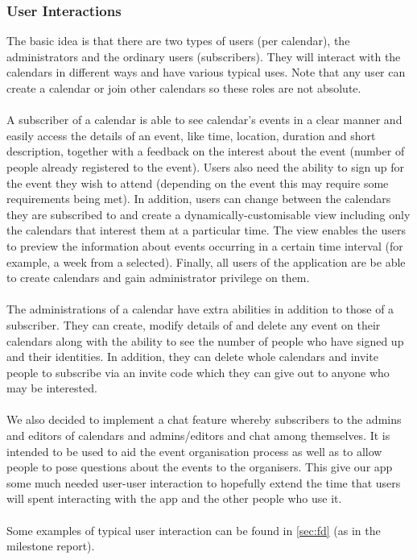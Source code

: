 \documentclass[10pt,a4paper]{article}
\begin{document}
\subsubsection{User Interactions}
The basic idea is that there are two types of users (per calendar), the 
administrators and the ordinary users (subscribers). They will interact with the 
calendars in diﬀerent ways and have various typical uses. Note that any user can 
create a calendar or join other calendars so these roles are not absolute.
\\
\\
\noindent
A subscriber of a calendar is able to see calendar’s events in a clear manner 
and easily access the details of an event, like time, location, duration and 
short description, together with a feedback on the interest about the event 
(number of people already registered to the event). Users also need the ability 
to sign up for the event they wish to attend (depending on the event this may 
require some requirements being met). In addition, users can change between the 
calendars they are subscribed to and create a dynamically-customisable view 
including only the calendars that interest them at a particular time. The view 
enables the users to preview the information about events occurring in a certain 
time interval (for example, a week from a selected). Finally, all users of the 
application are be able to create calendars and gain administrator privilege on 
them.
\\
\\
\noindent
The administrations of a calendar have extra abilities in addition to those of a subscriber. They can create, modify details of and delete any event on their calendars along with the ability to see the number of people who have signed up and their identities. In addition, they can delete whole calendars and invite people to subscribe via an invite code which they can give out to anyone who may be interested.
\\
\\
\noindent
We also decided to implement a chat feature whereby subscribers to the admins and editors of calendars and admins/editors and chat among themselves. It is intended to be used to aid the event organisation process as well as to allow people to pose questions about the events to the organisers. This give our app some much needed user-user interaction to hopefully extend the time that users will spent interacting with the app and the other people who use it.
\\
\\
\noindent Some examples of typical user interaction can be found in \cref{sec:fd} (as in the milestone report).   
\end{document}
